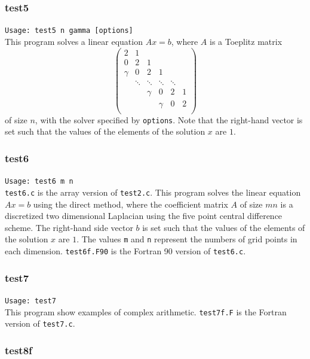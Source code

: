\documentclass[a4paper]{article}
\begin{document}
\subsubsection{test5}

\verb+Usage: test5 n gamma [options]+\\

This program solves a linear equation $Ax =b$, where $A$ is a Toeplitz matrix
\[
\left(
\begin{array}{cccccc}
2 & 1 &   &  &  & \\
0 & 2 & 1 &  &  & \\
\gamma & 0& 2 & 1 &  & \\
 & \ddots & \ddots & \ddots & \ddots & \\
 &  &   \gamma &0 &       2   & 1 \\
 &  &  &   \gamma & 0& 2 \\
\end{array}
\right)
\]
of size $n$, with the solver specified by {\tt options}. 
Note that the right-hand vector is set such that the values of the elements 
of the solution $x$ are $1$. 

\subsubsection{test6}

\verb+Usage: test6 m n+\\

{\tt test6.c} is the array version of {\tt test2.c}.
This program solves the linear equation $Ax = b$ using the direct method,
where the coefficient 
matrix $A$ of size $mn$ is a discretized two dimensional 
Laplacian using the five
point central difference scheme. 
The right-hand side vector $b$ is set such that the values of the elements
of the solution $x$ are $1$. 
The values {\tt m} and  {\tt n} represent the numbers of grid points
in each dimension. 
{\tt test6f.F90} is the Fortran 90 version of {\tt test6.c}.

\subsubsection{test7}

\verb+Usage: test7+\\

This program show examples of complex arithmetic.
{\tt test7f.F} is the Fortran version of {\tt test7.c}.

\subsubsection{test8f}
\end{document}
